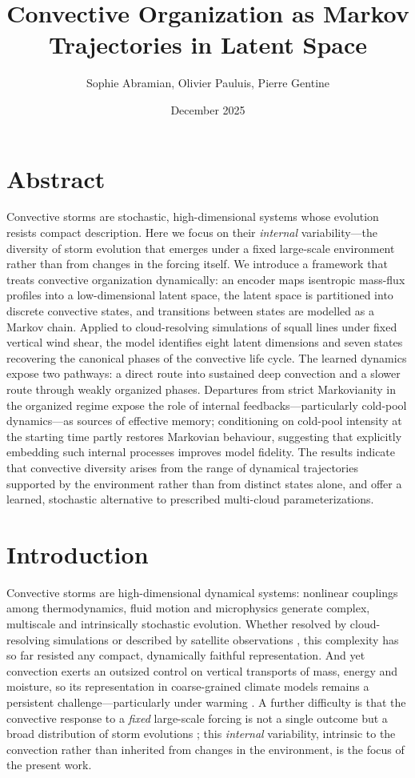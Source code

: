 \documentclass[11pt]{article}
\title{Convective Organization as Markov Trajectories in Latent Space}
\author{Sophie Abramian, Olivier Pauluis, Pierre Gentine}
\date{December 2025}
\begin{document}
\maketitle


\section*{Abstract}
Convective storms are stochastic, high-dimensional systems whose evolution resists compact description. Here we focus on their \emph{internal} variability---the diversity of storm evolution that emerges under a fixed large-scale environment rather than from changes in the forcing itself. We introduce a framework that treats convective organization dynamically: an encoder maps isentropic mass-flux profiles into a low-dimensional latent space, the latent space is partitioned into discrete convective states, and transitions between states are modelled as a Markov chain. Applied to cloud-resolving simulations of squall lines under fixed vertical wind shear, the model identifies eight latent dimensions and seven states recovering the canonical phases of the convective life cycle. The learned dynamics expose two pathways: a direct route into sustained deep convection and a slower route through weakly organized phases. Departures from strict Markovianity in the organized regime expose the role of internal feedbacks---particularly cold-pool dynamics---as sources of effective memory; conditioning on cold-pool intensity at the starting time partly restores Markovian behaviour, suggesting that explicitly embedding such internal processes improves model fidelity. The results indicate that convective diversity arises from the range of dynamical trajectories supported by the environment rather than from distinct states alone, and offer a learned, stochastic alternative to prescribed multi-cloud parameterizations.

\section{Introduction}

Convective storms are high-dimensional dynamical systems: nonlinear couplings among thermodynamics, fluid motion and microphysics generate complex, multiscale and intrinsically stochastic evolution. Whether resolved by cloud-resolving simulations \citep{feng2025mesoscale} or described by satellite observations \citep{hu2020observed, fiolleau2024database}, this complexity has so far resisted any compact, dynamically faithful representation. And yet convection exerts an outsized control on vertical transports of mass, energy and moisture, so its representation in coarse-grained climate models remains a persistent challenge---particularly under warming \citep{yang2023impact, bolot2025no, prein2022towards, chakraborty2023overview}. A further difficulty is that the convective response to a \emph{fixed} large-scale forcing is not a single outcome but a broad distribution of storm evolutions \citep{abramian2025key}; this \emph{internal} variability, intrinsic to the convection rather than inherited from changes in the environment, is the focus of the present work.
\end{document}
